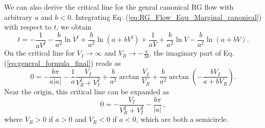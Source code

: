 \documentclass[aps,prl,twocolumn,nofootinbib,superscriptaddress,longbibliography]{revtex4-1}
\begin{document}
We can also derive the critical line for the genral canonical RG flow with arbitrary $a$ and $b<0$. Integrating Eq. (\ref{eq:RG_Flow_Equ_Marginal_canonical}) with respect to $t$, we obtain
\begin{equation}
	t=-\frac{1}{a V^{\mathrm{f}}}-\frac{b}{a^2}\ln{V^\mathrm{f}}+\frac{b}{a^2}\ln{(a+b V^\mathrm{f})}+\frac{1}{a V}+\frac{b}{a^2}\ln{V}-\frac{b}{a^2}\ln{(a+b V)}.
\label{eq:general_formula_final}
\end{equation}
On the critical line for $V_I\to\infty$ and $V_R\to-\frac{a}{3b}$, the imaginary part of Eq. (\ref{eq:general_formula_final}) reads as 
\begin{equation}
	0=-\frac{b\pi}{a|a|}-\frac{1}{a}\frac{V_I}{V_R^2+V_I^2}+\frac{b}{a^2}\arctan{\frac{V_I}{V_R}}+\frac{b}{a^2}\arctan{(-\frac{b V_I}{a+b V_R})}.
\label{eq:imaginary_part_boundary}
\end{equation}
Near the origin, this critical line can be expanded as 
\begin{equation}
0=-\frac{V_I}{V_R^2+V_I^2}-\frac{b\pi}{|a|}\,,%
\end{equation}
where $V_R>0$ if $a>0$ and $V_R<0$ if $a<0$, which are both a semicircle.


\end{document}
